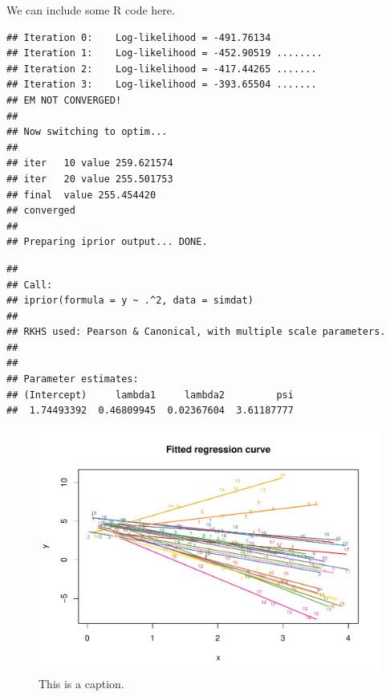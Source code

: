 %



We can include some R code here.

\begin{knitrout}
\color{fgcolor}\begin{kframe}
\begin{alltt}
 \hlkwb{<-} \hlstd{(} \hlopt{~}  \hlopt{^} \hlstd{,}  
\end{alltt}
\begin{verbatim}
## Iteration 0:    Log-likelihood = -491.76134 
## Iteration 1:    Log-likelihood = -452.90519 ........
## Iteration 2:    Log-likelihood = -417.44265 .......
## Iteration 3:    Log-likelihood = -393.65504 .......
## EM NOT CONVERGED!
## 
## Now switching to optim...
## 
## iter   10 value 259.621574
## iter   20 value 255.501753
## final  value 255.454420 
## converged
## 
## Preparing iprior output... DONE.
\end{verbatim}
\begin{alltt}
\end{alltt}
\begin{verbatim}
## 
## Call:
## iprior(formula = y ~ .^2, data = simdat)
## 
## RKHS used: Pearson & Canonical, with multiple scale parameters.
## 
## 
## Parameter estimates:
## (Intercept)     lambda1     lambda2         psi 
##  1.74493392  0.46809945  0.02367604  3.61187777
\end{verbatim}
\end{kframe}
\end{knitrout}
\begin{knitrout}
\color{fgcolor}\begin{figure}[h]

{\centering \includegraphics[width=\maxwidth]{figure/iprior_plot-1} 

}

\caption[This is a caption]{This is a caption.}\label{fig:iprior.plot}
\end{figure}


\end{knitrout}

